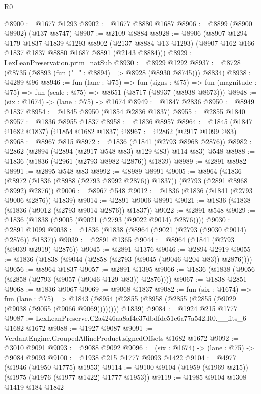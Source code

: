 \begin{lexlean}{R0}
\begin{coremodule}
@8900 := @1677 @1293
@8902 := @1677 @8880 @1687
@8906 := @8899 (@8900 @8902) (@137 @8747)
@8907 := @2109 @8884
@8928 := @8906
    (@8907
      @1294
      @179
      @1837
      @1839
      @1293
      @8902
      (@2137 @8884 @13 @1293)
      (@8907 @162 @166 @1837 @1837 @8880 @1687 @8891 (@2143 @8884)))
@8929 := LexLeanPreservation.prim_natSub
@8930 := @8929 @1292
@8937 := @8728 (@8735 (@8893 (fun ("_" : @8894) => @8928 (@8930 @8745))) @8834)
@8938 := @4289 @96
@8946 := fun (lane : @75) =>
  fun (signs : @75) =>
  fun (magnitude : @75) => fun (scale : @75) => @8651 (@8717 (@8937 (@8938 @8673)))
@8948 := (six : @1674) -> (lane : @75) -> @1674
@8949 := @1847 @2836
@8950 := @8949 @1837
@8954 := @1845 @8950 (@1854 @2836 @1837)
@8955 := @2855 @1840
@8957 := @1836 @8955 @1837
@8958 := @1836 @8957
@8964 := @1845 (@1847 @1682 @1837) (@1854 @1682 @1837)
@8967 := @2862 (@2917 @1099 @83)
@8968 := @8967 @815
@8972 := @1836 (@1841 (@2793 @8968 @2876))
@8982 := @2862 (@2894 (@2894 (@2917 @548 @83) @129 @83) @114 @83) @548
@8988 := @1836 (@1836 (@2961 (@2793 @8982 @2876)) @1839)
@8989 := @2891 @8982
@8991 := @2895 @548 @83
@8992 := @8989 @8991
@9005 := @8964
    (@1836 (@8972 (@1836 (@8988 (@2793 @8992 @2876)) @1837)) (@2793 (@2891 @8968 @8992) @2876))
@9006 := @8967 @548
@9012 := @1836 (@1836 (@1841 (@2793 @9006 @2876)) @1839)
@9014 := @2891 @9006 @8991
@9021 := @1836 (@1838 (@1836 (@9012 (@2793 @9014 @2876)) @1837))
@9022 := @2891 @548
@9029 := @1836 (@1838 (@9005 (@9021 (@2793 (@9022 @9014) @2876))))
@9030 := @2891 @1099
@9038 := @1836 (@1838 (@8964 (@9021 (@2793 (@9030 @9014) @2876)) @1837))
@9039 := @2891 @1365
@9044 := @8964 (@1841 (@2793 (@9039 @2919) @2876))
@9045 := @2891 @1376
@9046 := @2894 @2919
@9055 := @1836 (@1838 (@9044 (@2858 (@2793 (@9045 (@9046 @204 @83)) @2876))))
@9056 := @8964 @1837
@9057 := @2891 @1395
@9066 := @1836 (@1838 (@9056 (@2858 (@2793 (@9057 (@9046 @129 @83)) @2876))))
@9067 := @1838 @2851
@9068 := @1836 @9067
@9069 := @9068 @1837
@9082 := fun (six : @1674) =>
  fun (lane : @75) =>
  @1843 (@8954 (@2855 (@8958 (@2855 (@2855 (@9029 (@9038 (@9055 (@9066 @9069)))))))) @1839)
@9084 := @1924 @215 @1777
@9087 := LexLeanPreserve.C2a4246aa8af4e37dbdfde51c6a77a542.R0.__fits_6 @1682 @1672
@9088 := @1927 @9087
@9091 := VerdantEngine.GroupedAffineProduct.signedOffsets @1682 @1672
@9092 := @3010 @9091
@9093 := @9088 @9092
@9096 := (six : @1674) -> (lane : @75) -> @9084 @9093
@9100 := @1938 @215 @1777 @9093 @1422
@9104 := @4977 (@1946 (@1950 @1775) @1953)
@9114 := @9100 @9104 (@1959 (@1969 @215)) (@1975 (@1976 (@1977 @1422) @1777 @1953))
@9119 := @1985 @9104 @1308 @1419 @184 @1842

\end{coremodule}
\end{lexlean}
